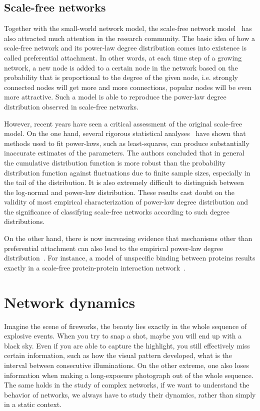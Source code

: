 \subsection{Scale-free networks}
\label{sec:scale_free}
Together with the small-world network model, the scale-free network model~%
\citep{Barabasi1999} has
also attracted much attention in the research community. The basic idea of 
how a scale-free network and its power-law degree distribution comes into
existence is called preferential attachment. In other words, at each time
step of a growing network, a new node is added to a certain node in the 
network based on the probability that is proportional to the degree of the
given node, i.e. strongly connected nodes will get more and more connections,
popular nodes will be even more attractive. Such a model is able to reproduce
the power-law degree distribution observed in scale-free networks.

However, recent years have seen a critical assessment of the original 
scale-free model. On the one hand, several rigorous statistical analyses~%
\citep{Clauset2009,Khanin2006a} have shown that methods used to fit power-laws, such as 
least-squares, can produce substantially inaccurate estimates of the 
parameters. The authors concluded that in general the cumulative distribution
function is more robust than the probability distribution function against 
fluctuations due to finite sample sizes, especially in the tail of the 
distribution. It is also extremely difficult to distinguish between
the log-normal and power-law distribution. These results cast doubt on the
validity of most empirical characterization of power-law degree distribution
and the significance of classifying scale-free networks according to such
degree distributions.

On the other hand, there is now increasing evidence that mechanisms other than
preferential attachment can also lead to the empirical power-law degree 
distribution~\citep{Caldarelli2002}. For instance, a model of unspecific 
binding between proteins results exactly in a scale-free protein-protein 
interaction network~\citep{Deeds2006}.

\section{Network dynamics}
Imagine the scene of fireworks, the beauty lies exactly in the whole sequence 
of explosive events. When you try to snap a shot, maybe you will end up with
a black sky. Even if you are able to capture the highlight, you still 
effectively miss certain information, such as how the visual pattern developed,
what is the interval between consecutive illuminations. 
On the other extreme, one also loses information when making
a long-exposure photograph out of the whole sequence.
The same holds in the
study of complex networks, if we want to understand the behavior of networks,
we always have to study their dynamics, rather than simply in a static context.

